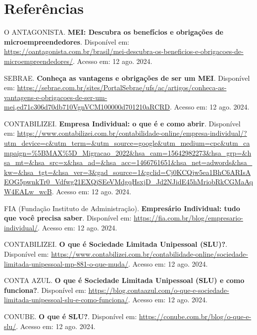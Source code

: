 
\section{Referências}

\vspace{0.5cm} %

\noindent O ANTAGONISTA. \textbf{MEI: Descubra os benefícios e obrigações de microempreendedores}. Disponível em: \url{https://oantagonista.com.br/brasil/mei-descubra-os-beneficios-e-obrigacoes-de-microempreendedores/}. Acesso em: 12 ago. 2024.

\noindent SEBRAE. \textbf{Conheça as vantagens e obrigações de ser um MEI}. Disponível em: \url{https://sebrae.com.br/sites/PortalSebrae/ufs/ac/artigos/conheca-as-vantagens-e-obrigacoes-de-ser-um-mei,ed71c306d70db710VgnVCM100000d701210aRCRD}. Acesso em: 12 ago. 2024.

\noindent CONTABILIZEI. \textbf{Empresa Individual: o que é e como abrir}. Disponível em: \url{https://www.contabilizei.com.br/contabilidade-online/empresa-individual/?utm_device=c&utm_term=&utm_source=google&utm_medium=cpc&utm_campaign=%5BMAX%5D_Migracao_2022&hsa_cam=15642982273&hsa_grp=&hsa_mt=&hsa_src=x&hsa_ad=&hsa_acc=1466761651&hsa_net=adwords&hsa_kw=&hsa_tgt=&hsa_ver=3&gad_source=1&gclid=Cj0KCQjw5ea1BhC6ARIsAEOG5pwnkTr0_Vdfwg21EXQjSEeVMdgqHsxjD_Jd2NJidE45hMriobRkCGMaAqW4EALw_wcB}. Acesso em: 12 ago. 2024.

\noindent FIA (Fundação Instituto de Administração). \textbf{Empresário Individual: tudo que você precisa saber}. Disponível em: \url{https://fia.com.br/blog/empresario-individual/}. Acesso em: 12 ago. 2024.

\noindent CONTABILIZEI. \textbf{O que é Sociedade Limitada Unipessoal (SLU)?}. Disponível em: \url{https://www.contabilizei.com.br/contabilidade-online/sociedade-limitada-unipessoal-mp-881-o-que-muda/}. Acesso em: 12 ago. 2024.

\noindent CONTA AZUL. \textbf{O que é Sociedade Limitada Unipessoal (SLU) e como funciona?}. Disponível em: \url{https://blog.contaazul.com/o-que-e-sociedade-limitada-unipessoal-slu-e-como-funciona/}. Acesso em: 12 ago. 2024.

\noindent CONUBE. \textbf{O que é SLU?}. Disponível em: \url{https://conube.com.br/blog/o-que-e-slu/}. Acesso em: 12 ago. 2024.

